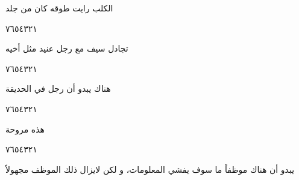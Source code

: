 \documentclass[11pt, a4paper]{article}
\begin{document}
{\vspace{0.5\baselineskip}\begin{flushright}
\textarabic{الكلب رايت طوقه كان من جلد}
\end{flushright}

\begin{center}
        \hfill\textarabic{٧}\hfill\textarabic{٦}\hfill\textarabic{٥}\hfill\textarabic{٤}\hfill\textarabic{٣}\hfill\textarabic{٢}\hfill\textarabic{١}
        \end{center}


\vspace{0.5\baselineskip}\begin{flushright}
\textarabic{تجادل سيف مع رجل عنيد مثل أخيه}
\end{flushright}

\begin{center}
        \hfill\textarabic{٧}\hfill\textarabic{٦}\hfill\textarabic{٥}\hfill\textarabic{٤}\hfill\textarabic{٣}\hfill\textarabic{٢}\hfill\textarabic{١}
        \end{center}


\vspace{0.5\baselineskip}\begin{flushright}
\textarabic{هناك يبدو أن رجل في الحديقة}
\end{flushright}

\begin{center}
        \hfill\textarabic{٧}\hfill\textarabic{٦}\hfill\textarabic{٥}\hfill\textarabic{٤}\hfill\textarabic{٣}\hfill\textarabic{٢}\hfill\textarabic{١}
        \end{center}


\vspace{0.5\baselineskip}\begin{flushright}
\textarabic{هذه مروحة}
\end{flushright}

\begin{center}
        \hfill\textarabic{٧}\hfill\textarabic{٦}\hfill\textarabic{٥}\hfill\textarabic{٤}\hfill\textarabic{٣}\hfill\textarabic{٢}\hfill\textarabic{١}
        \end{center}

\vfill\clearpage

\vspace{0.5\baselineskip}\begin{flushright}
\textarabic{يبدو أن هناك موظفاً ما سوف يفشي المعلومات، و لكن لايزال ذلك الموظف مجهولاً}
\end{flushright}

}
\end{document}

